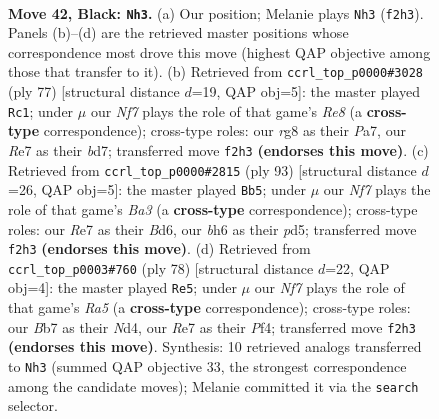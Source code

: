 \documentclass[11pt]{article}
\begin{document}
\clearpage

\begin{figure}[p]\centering
\begin{subfigure}{0.46\textwidth}\centering
\resizebox{\linewidth}{!}{%
\newchessgame
\chessboard[
  setfen={6R1/pb1pr3/7B/5k2/2B5/8/PPK2n2/8 b - - 5 42},
  showmover=false,
  pgfstyle=straightmove, color=movearrow, markmove={f2-h3}
]}
\caption{}
\end{subfigure}\hfill
\begin{subfigure}{0.46\textwidth}\centering
\resizebox{\linewidth}{!}{%
\newchessgame
\chessboard[
  setfen={6k1/p2B1p2/2PB4/3n4/P7/5P2/6K1/4r3 b - - 0 39},
  showmover=false,
  pgfstyle=straightmove, color=movearrow, markmove={e1-c1}
]}
\caption{}
\end{subfigure}
\\[4pt]
\begin{subfigure}{0.46\textwidth}\centering
\resizebox{\linewidth}{!}{%
\newchessgame
\chessboard[
  setfen={8/5k2/b2b4/3Pp1Bp/4B2P/8/1P3K2/8 b - - 4 47},
  showmover=false,
  pgfstyle=straightmove, color=movearrow, markmove={a6-b5}
]}
\caption{}
\end{subfigure}\hfill
\begin{subfigure}{0.46\textwidth}\centering
\resizebox{\linewidth}{!}{%
\newchessgame
\chessboard[
  setfen={8/5kpp/8/R5P1/3NbP2/2r5/5K2/8 w - - 3 40},
  showmover=false,
  pgfstyle=straightmove, color=movearrow, markmove={a5-e5}
]}
\caption{}
\end{subfigure}
\caption{\textbf{Move 42, Black: \texttt{Nh3}.} (a) Our position; Melanie plays \texttt{Nh3} (\texttt{f2h3}). Panels (b)--(d) are the retrieved master positions whose correspondence most drove this move (highest QAP objective among those that transfer to it). (b) Retrieved from \texttt{ccrl\_top\_p0000\#3028} (ply 77) [structural distance $d$=19, QAP obj=5]: the master played \texttt{Rc1}; under $\mu$ our \emph{Nf7} plays the role of that game's \emph{Re8} (a \textbf{cross-type} correspondence); cross-type roles: our \emph{r}g8 as their \emph{P}a7, our \emph{R}e7 as their \emph{b}d7; transferred move \texttt{f2h3} \textbf{(endorses this move)}. (c) Retrieved from \texttt{ccrl\_top\_p0000\#2815} (ply 93) [structural distance $d$=26, QAP obj=5]: the master played \texttt{Bb5}; under $\mu$ our \emph{Nf7} plays the role of that game's \emph{Ba3} (a \textbf{cross-type} correspondence); cross-type roles: our \emph{R}e7 as their \emph{B}d6, our \emph{b}h6 as their \emph{p}d5; transferred move \texttt{f2h3} \textbf{(endorses this move)}. (d) Retrieved from \texttt{ccrl\_top\_p0003\#760} (ply 78) [structural distance $d$=22, QAP obj=4]: the master played \texttt{Re5}; under $\mu$ our \emph{Nf7} plays the role of that game's \emph{Ra5} (a \textbf{cross-type} correspondence); cross-type roles: our \emph{B}b7 as their \emph{N}d4, our \emph{R}e7 as their \emph{P}f4; transferred move \texttt{f2h3} \textbf{(endorses this move)}. Synthesis: 10 retrieved analogs transferred to \texttt{Nh3} (summed QAP objective 33, the strongest correspondence among the candidate moves); Melanie committed it via the \texttt{search} selector.}
\label{fig:thought-m83}
\end{figure}
\end{document}
